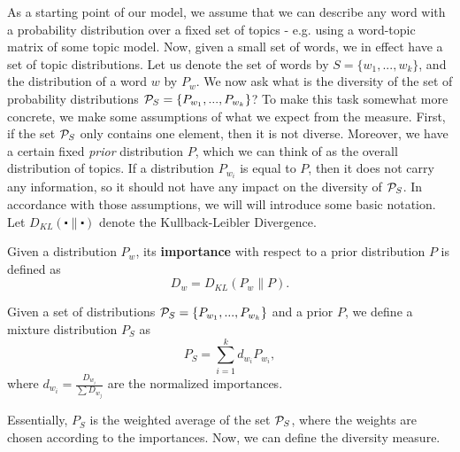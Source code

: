 %
As a starting point of our model, we assume that we can describe any
word with a probability distribution over a fixed set of topics -
e.g. using a word-topic matrix of some topic model. Now, given a small
set of words, we in effect have a set of topic distributions. Let us
denote the set of words by $S=\{w_1,...,w_k\}$, and the distribution
of a word $w$ by $P_w$.  We now ask
what is the diversity of the set of probability
distributions ${\mathcal P}_S=\{P_{w_1},...,P_{w_k}\}$? To make this task
somewhat more concrete, we make some 
assumptions of what we expect from the measure. First, if the set
${\mathcal P}_S$ only contains one element, then it is not diverse. Moreover,
we have a certain fixed {\em prior} distribution $P$, which we
can think of as the overall distribution of topics. If a distribution
$P_{w_i}$ is equal to $P$, then it does not carry any information, so
it should not have any impact on the diversity of ${\mathcal P}_S$. In
accordance with those assumptions, we will will introduce some basic
notation. Let $D_{KL}(\centerdot\|\centerdot)$ denote the
Kullback-Leibler Divergence.

\bed
Given a distribution $P_w$, its {\bf importance} with respect to a
prior distribution $P$ is defined as 
\[D_w = D_{KL}(P_w\|P).\]
\eed

\bed\label{mixture}
Given a set of distributions ${\mathcal P}_S=\{P_{w_1},...,P_{w_k}\}$ and a
prior $P$, we
define a mixture distribution $P_S$ as
\[P_S=\sum_{i=1}^k d_{w_i} P_{w_i},\]
where $d_{w_i}=\frac{D_{w_i}}{\sum D_{w_j}}$ are the normalized
importances.
\eed

Essentially, $P_S$ is the weighted average of the set ${\mathcal P}_S$, where
the weights are chosen according to the importances. Now, we can
define the diversity measure.

